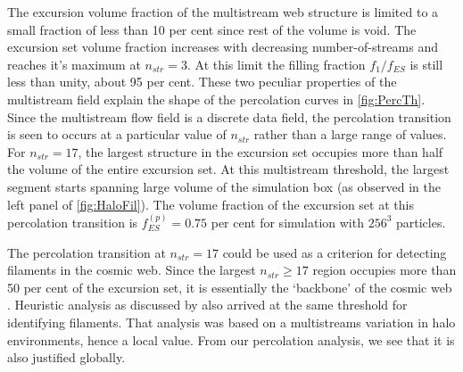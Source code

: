 \documentclass[fleqn,usenatbib,useAMS]{mnras}
\begin{document}
The excursion volume fraction of the multistream web structure is limited to a small fraction of  less than 10 per cent since rest of the volume is void. The excursion set volume fraction increases with decreasing number-of-streams and reaches it's maximum at $n_{str} = 3$.  At this limit the filling fraction $f_1/f_{ES}$ is still less than unity, about 95 per cent. These two peculiar properties of the multistream field explain the shape of the percolation curves in \autoref{fig:PercTh}.
Since the multistream flow field is a discrete data field, the percolation transition is seen to occurs at a particular value of $n_{str}$ rather than a large range of values. For $n_{str} = 17$, the largest structure in the excursion set occupies more than half the volume of the entire excursion set. At this multistream threshold, the largest segment starts spanning large volume of the simulation box (as observed in the left panel of \autoref{fig:HaloFil}). The volume fraction of the excursion set at this percolation transition is $f_{ES}^{(p)} = 0.75$ per cent for simulation with $256^3$ particles. 

The percolation transition at $n_{str} = 17$ could be used as a criterion for detecting filaments in the cosmic web. Since the largest $n_{str} \geq 17$ region occupies more than 50 per cent of the excursion set, it is essentially the `backbone' of the cosmic web \citep{Shandarin2010b}. Heuristic analysis as discussed by \cite{Ramachandra2015} also arrived at the same threshold for identifying filaments. That analysis was based on a multistreams variation in halo environments, hence a local value. From our percolation analysis, we see that it is also justified globally. 

\end{document}
